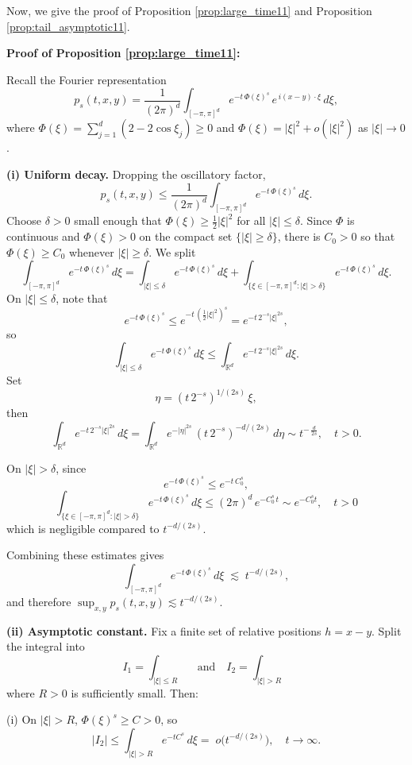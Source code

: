 \documentclass[reqno,12pt]{amsart}
\numberwithin{equation}{section}
\begin{document}
Now, we give the proof of Proposition \ref{prop:large_time11} and Proposition \ref{prop:tail_asymptotic11}. 
	\vspace{1\baselineskip}
	
\noindent \textbf{Proof of Proposition \ref{prop:large_time11}:}

	Recall the Fourier representation
	\[
	p_s(t,x,y)
	=\frac{1}{(2\pi)^d}
	\int_{[-\pi,\pi]^d}e^{-t\,\Phi(\xi)^s}\,e^{\,i(x-y)\cdot\xi}\,d\xi,
	\]
	where \(\Phi(\xi)=\sum_{j=1}^d(2-2\cos\xi_j)\ge0\) and \(\Phi(\xi)=|\xi|^2+o\left(|\xi|^2\right)\) as \(\left|\xi\right|\to0\).
	
	\medskip\noindent\textbf{(i) Uniform decay.}
	Dropping the oscillatory factor,
	\[
	p_s(t,x,y)\le\frac{1}{(2\pi)^d}
	\int_{[-\pi,\pi]^d}e^{-t\,\Phi(\xi)^s}\,d\xi.
	\]
Choose \(\delta>0\) small enough that 
\(\Phi(\xi)\ge\tfrac12|\xi|^2\) for all \(|\xi|\le\delta\).  Since \(\Phi\) is continuous and \(\Phi(\xi)>0\) on the compact set \(\{|\xi|\ge\delta\}\), there is \(C_0>0\) so that \(\Phi(\xi)\ge C_0\) whenever \(|\xi|\ge\delta\).  We split
\[
\int_{[-\pi,\pi]^d}e^{-t\,\Phi(\xi)^s}\,d\xi
=\int_{|\xi|\le\delta}e^{-t\,\Phi(\xi)^s}\,d\xi
+\int_{\{\xi\in[-\pi,\pi]^d:|\xi|>\delta\}}e^{-t\,\Phi(\xi)^s}\,d\xi.
\]
On \(|\xi|\le\delta\), note that
\[
e^{-t\,\Phi(\xi)^s}
\le e^{-t\,( \tfrac12|\xi|^2 )^s}
=e^{-t\,2^{-s}|\xi|^{2s}},
\]
so
\[
\int_{|\xi|\le\delta}e^{-t\,\Phi(\xi)^s}\,d\xi
\le\int_{\mathbb{R}^d}e^{-t\,2^{-s}|\xi|^{2s}}\,d\xi.
	\]
Set
$$
\eta = (t\,2^{-s})^{1/(2s)}\,\xi,
$$
then
$$
\int_{\mathbb{R}^d}e^{-t\,2^{-s}|\xi|^{2s}}\,d\xi
=\int_{\mathbb{R}^d}e^{-|\eta|^{2s}}
\,(t\,2^{-s})^{-d/(2s)}\,d\eta\sim t^{-\,\tfrac{d}{2s}}, \quad t>0.
$$

On \(|\xi|>\delta\), since
\[
e^{-t\,\Phi(\xi)^s}
\le e^{-t\,C_0^s},
\]
\[
\int_{\{\xi\in[-\pi,\pi]^d:|\xi|>\delta\}}e^{-t\,\Phi(\xi)^s}\,d\xi
\le(2\pi)^d\,e^{-C_0^s\,t}\sim e^{-C_0^{s}t},\quad t>0\]
which is negligible compared to \(t^{-d/(2s)}\).  

Combining these estimates gives
\[
\int_{[-\pi,\pi]^d}e^{-t\,\Phi(\xi)^s}\,d\xi
\;\lesssim\;
t^{-d/(2s)},
\]
and therefore \(\sup_{x,y}p_s(t,x,y)\lesssim t^{-d/(2s)}\).  

	\medskip\noindent\textbf{(ii) Asymptotic constant.}
	Fix a finite set of relative positions \(h=x-y\).  Split the integral into
	\[
	I_1=\int_{|\xi|\le R}\quad\text{and}\quad I_2=\int_{|\xi|>R}
	\]
where \(R>0\) is sufficiently small. Then: 
	
	(i) On \(|\xi|>R\), \(\Phi(\xi)^s\ge C>0\), so
	\[
	|I_2|\le \int_{|\xi|>R}e^{-tC^{s}}\,d\xi=\;o\bigl(t^{-d/(2s)}\bigr),\quad t\rightarrow \infty.
	\]
	
\end{document}
